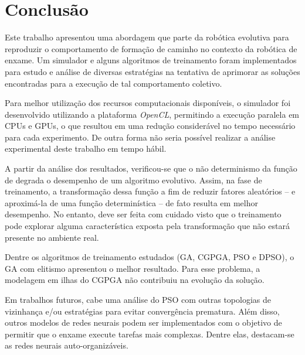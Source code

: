 \chapter{Conclusão}
\label{cha:conclusion}

Este trabalho apresentou uma abordagem que parte da robótica evolutiva para reproduzir o comportamento de formação de caminho no contexto da robótica de enxame. Um simulador e alguns algoritmos de treinamento foram implementados para estudo e análise de diversas estratégias na tentativa de aprimorar as soluções encontradas para a execução de tal comportamento coletivo.

Para melhor utilização dos recursos computacionais disponíveis, o simulador foi desenvolvido utilizando a plataforma \textit{OpenCL}, permitindo a execução paralela em CPUs e GPUs, o que resultou em uma redução considerável no tempo necessário para cada experimento. De outra forma não seria possível realizar a análise experimental deste trabalho em tempo hábil.

A partir da análise dos resultados, verificou-se que o não determinismo da função de \fitness degrada o desempenho de um algoritmo evolutivo. Assim, na fase de treinamento, a transformação dessa função a fim de reduzir fatores aleatórios -- e aproximá-la de uma função determinística -- de fato resulta em melhor desempenho. No entanto, deve ser feita com cuidado visto que o treinamento pode explorar alguma característica exposta pela transformação que não estará presente no ambiente real.

Dentre os algoritmos de treinamento estudados (GA, CGPGA, PSO e DPSO), o GA com elitismo apresentou o melhor resultado. Para esse problema, a modelagem em ilhas do CGPGA não contribuiu na evolução da solução.

Em trabalhos futuros, cabe uma análise do PSO com outras topologias de vizinhança e/ou estratégias para evitar convergência prematura. Além disso, outros modelos de redes neurais podem ser implementados com o objetivo de permitir que o enxame execute tarefas mais complexas. Dentre elas, destacam-se as redes neurais auto-organizáveis.